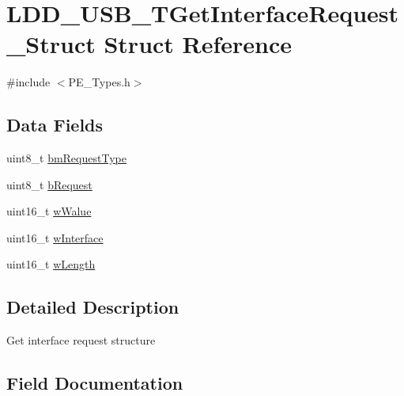 \hypertarget{struct_l_d_d___u_s_b___t_get_interface_request___struct}{}\section{L\+D\+D\+\_\+\+U\+S\+B\+\_\+\+T\+Get\+Interface\+Request\+\_\+\+Struct Struct Reference}
\label{struct_l_d_d___u_s_b___t_get_interface_request___struct}


{\ttfamily \#include $<$P\+E\+\_\+\+Types.\+h$>$}

\subsection*{Data Fields}
\begin{DoxyCompactItemize}
\item 
uint8\+\_\+t \hyperlink{struct_l_d_d___u_s_b___t_get_interface_request___struct_a2b04fcd64b22914d50af67b1b44dcb36}{bm\+Request\+Type}
\item 
uint8\+\_\+t \hyperlink{struct_l_d_d___u_s_b___t_get_interface_request___struct_a322309595b9cbe6bb0a391d463138e3d}{b\+Request}
\item 
uint16\+\_\+t \hyperlink{struct_l_d_d___u_s_b___t_get_interface_request___struct_a48bcaf6af044e3e9669f5ea634a2b9fe}{w\+Walue}
\item 
uint16\+\_\+t \hyperlink{struct_l_d_d___u_s_b___t_get_interface_request___struct_ac3dc3f80a292a73950254f8ce4c99a73}{w\+Interface}
\item 
uint16\+\_\+t \hyperlink{struct_l_d_d___u_s_b___t_get_interface_request___struct_a2aa1550fc5e72002a94c74ea0957ec74}{w\+Length}
\end{DoxyCompactItemize}


\subsection{Detailed Description}
Get interface request structure 

\subsection{Field Documentation}
\hypertarget{struct_l_d_d___u_s_b___t_get_interface_request___struct_a2b04fcd64b22914d50af67b1b44dcb36}{}
